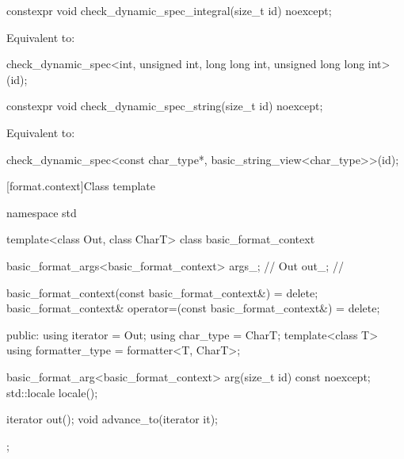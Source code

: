 %
\begin{itemdecl}
constexpr void check_dynamic_spec_integral(size_t id) noexcept;
\end{itemdecl}

\begin{itemdescr}
\pnum
\effects
Equivalent to:
\begin{codeblock}
check_dynamic_spec<int, unsigned int, long long int, unsigned long long int>(id);
\end{codeblock}
\end{itemdescr}

%
\begin{itemdecl}
constexpr void check_dynamic_spec_string(size_t id) noexcept;
\end{itemdecl}

\begin{itemdescr}
\pnum
\effects
Equivalent to:
\begin{codeblock}
check_dynamic_spec<const char_type*, basic_string_view<char_type>>(id);
\end{codeblock}
\end{itemdescr}

[format.context]{Class template }

%
%
%
%
\begin{codeblock}
namespace std {
  template<class Out, class CharT>
  class basic_format_context {
    basic_format_args<basic_format_context> args_;      // \expos
    Out out_;                                           // \expos

    basic_format_context(const basic_format_context&) = delete;
    basic_format_context& operator=(const basic_format_context&) = delete;

  public:
    using iterator = Out;
    using char_type = CharT;
    template<class T> using formatter_type = formatter<T, CharT>;

    basic_format_arg<basic_format_context> arg(size_t id) const noexcept;
    std::locale locale();

    iterator out();
    void advance_to(iterator it);
  };
}
\end{codeblock}

